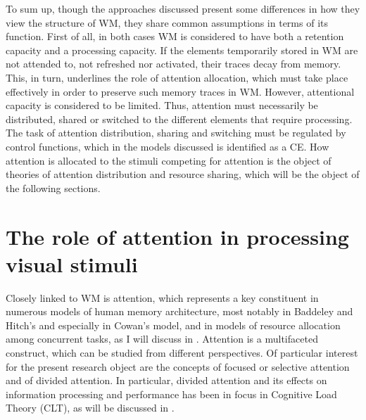 To sum up, though the approaches discussed present some differences in how they view the structure of WM, they share common assumptions in terms of its function. First of all, in both cases WM is considered to have both a retention capacity and a processing capacity. If the elements temporarily stored in WM are not attended to, not refreshed nor activated, their traces decay from memory. This, in turn, underlines the role of attention allocation, which must take place effectively in order to preserve such memory traces in WM. However, attentional capacity is considered to be limited. Thus, attention must necessarily be distributed, shared or switched to the different elements that require processing. The task of attention distribution, sharing and switching must be regulated by control functions, which in the models discussed is identified as a CE. How attention is allocated to the stimuli competing for attention is the object of theories of attention distribution and resource sharing, which will be the object of the following sections.

\section{The role of attention in processing visual stimuli} \label{attention}
Closely linked to WM is attention, which represents a key constituent in numerous models of human memory architecture, most notably in Baddeley and Hitch's and especially in Cowan's model, and in models of resource allocation among concurrent tasks, as I will discuss in . Attention is a multifaceted construct, which can be studied from different perspectives. Of particular interest for the present research object are the concepts of focused or selective attention and of divided attention. In particular, divided attention and its effects on information processing and performance has been in focus in Cognitive Load Theory (CLT), as will be discussed in .

